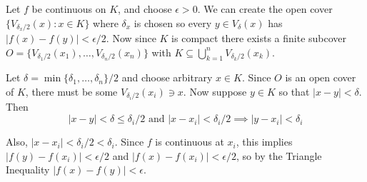 \begin{solution}
  Let $f$ be continuous on $K$, and choose $\epsilon > 0$. We can create the open cover $\{V_{\delta_x / 2}(x) : x \in K\}$ where $\delta_x$ is chosen so every $y \in V_\delta(x)$ has $|f(x)-f(y)|<\epsilon/2$.
  Now since $K$ is compact there exists a finite subcover $O = \{V_{\delta_1 / 2}(x_1), \dots, V_{\delta_n / 2}(x_n)\}$ with $K \subseteq \bigcup_{k=1}^n V_{\delta_k / 2}(x_k)$.

  Let $\delta = \min\{\delta_1, \dots, \delta_n\} / 2$ and choose arbitrary \(x \in K\). Since \(O\) is an open cover of \(K\), there must be some \(V_{\delta_i / 2} (x_i) \ni x\). Now suppose \(y \in K\) so that \(|x - y| < \delta\). Then
  \[|x - y| < \delta \leq \delta_i / 2 \text { and } |x - x_i| < \delta_i / 2 \implies |y - x_i| < \delta_i\]

  Also, \(|x - x_i| < \delta_i / 2 < \delta_i\). Since \(f\) is continuous at \(x_i\), this implies \(|f(y) - f(x_i)| < \epsilon / 2\) and \(|f(x) - f(x_i)| < \epsilon / 2\), so by the Triangle Inequality \(|f(x) - f(y)| < \epsilon\).

\end{solution}
